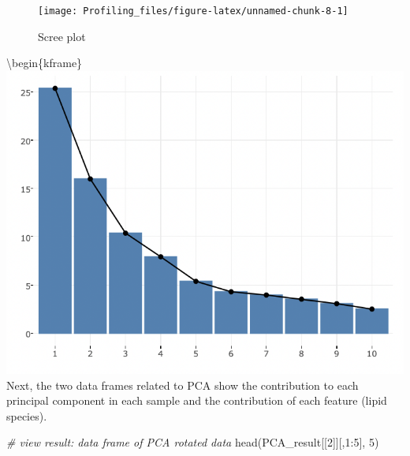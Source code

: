\documentclass[]{article}
\newcommand{\hlnum}[1]{\textcolor[rgb]{0.816,0.125,0.439}{#1}}%
\newcommand{\hlcom}[1]{\textcolor[rgb]{0.502,0.502,0.502}{\textit{#1}}}%
\newcommand{\hlopt}[1]{\textcolor[rgb]{0,0,0}{#1}}%
\newcommand{\hlstd}[1]{\textcolor[rgb]{0.251,0.251,0.251}{#1}}%
\newcommand{\hlkwd}[1]{\textcolor[rgb]{0.878,0.439,0.125}{#1}}%
\newenvironment{Shaded}{\begin{myshaded}}{\end{myshaded}}
\newcommand{\KeywordTok}[1]{\hlkwd{#1}}
\newcommand{\DecValTok}[1]{\hlnum{#1}}
\newcommand{\CommentTok}[1]{\hlcom{#1}}
\newcommand{\OperatorTok}[1]{\hlopt{#1}}
\newcommand{\NormalTok}[1]{\hlstd{#1}}
\begin{document}
\begin{figure}

{\centering \texttt{[image: Profiling\_files/figure-latex/unnamed-chunk-8-1]}

}

\caption{Scree plot}\label{fig:unnamed-chunk-8}
\end{figure}

\textbackslash begin\{kframe\}
\includegraphics{./image/pca_screeplot.png}
Next, the two data frames related to PCA show the contribution to each principal component in each sample and the contribution of each feature (lipid species).

\begin{Shaded}
\begin{Highlighting}[]
\CommentTok{# view result: data frame of PCA rotated data}
\KeywordTok{head}\NormalTok{(PCA_result[[}\DecValTok{2}\NormalTok{]][,}\DecValTok{1}\OperatorTok{:}\DecValTok{5}\NormalTok{], }\DecValTok{5}\NormalTok{)}
\end{Highlighting}
\end{Shaded}


  \providecommand{\huxb}[2]{\arrayrulecolor[RGB]{#1}\global\arrayrulewidth=#2pt}
  \providecommand{\huxvb}[2]{\color[RGB]{#1}\vrule width #2pt}
  \providecommand{\huxtpad}[1]{\rule{0pt}{#1}}
  \providecommand{\huxbpad}[1]{\rule[-#1]{0pt}{#1}}
\end{document}
